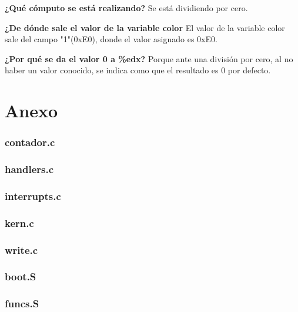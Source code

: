 \documentclass[a4paper]{article}
\begin{document}
\begin{list}{•}{}
\item \textbf{¿Qué cómputo se está realizando?} \newline
Se está dividiendo por cero.

\item \textbf{¿De dónde sale el valor de la variable color} \newline
El valor de la variable color sale del campo "1"(0xE0), donde el valor asignado es 0xE0.

\item \textbf{¿Por qué se da el valor 0 a \%edx?} \newline
Porque ante una división por cero, al no haber un valor conocido, se indica como que el resultado es 0 por defecto.

\end{list}

\section{Anexo}

\subsubsection{contador.c}

\subsubsection{handlers.c}

\subsubsection{interrupts.c}

\subsubsection{kern.c}

\subsubsection{write.c}

\subsubsection{boot.S}

\subsubsection{funcs.S}

\end{document}
